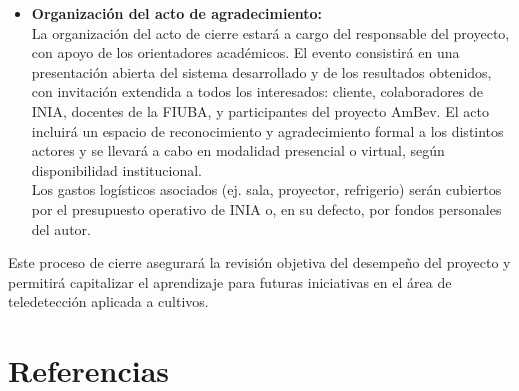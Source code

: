\documentclass[
11pt, %
]{charter}
\begin{document}
\begin{itemize}
    \item \textbf{Organización del acto de agradecimiento:}\\
    La organización del acto de cierre estará a cargo del responsable del proyecto, con apoyo de los orientadores académicos. El evento consistirá en una presentación abierta del sistema desarrollado y de los resultados obtenidos, con invitación extendida a todos los interesados: cliente, colaboradores de INIA, docentes de la FIUBA, y participantes del proyecto AmBev. El acto incluirá un espacio de reconocimiento y agradecimiento formal a los distintos actores y se llevará a cabo en modalidad presencial o virtual, según disponibilidad institucional.\\
    Los gastos logísticos asociados (ej. sala, proyector, refrigerio) serán cubiertos por el presupuesto operativo de INIA o, en su defecto, por fondos personales del autor.
\end{itemize}

Este proceso de cierre asegurará la revisión objetiva del desempeño del proyecto y permitirá capitalizar el aprendizaje para futuras iniciativas en el área de teledetección aplicada a cultivos.

\pagebreak

\section{Referencias}
\label{sec:cierre}
\end{document}

